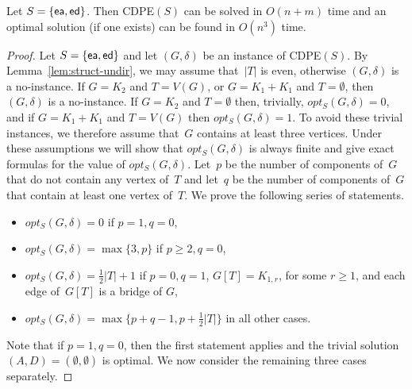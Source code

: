 \documentclass[11pt]{llncs}
\newcommand{\opts}{opt_S}
\newcommand{\ed}{{\sf ed}}
\newcommand{\ea}{{\sf ea}}
\newcommand{\cdpe}{{\sc CDPE}}
\begin{document}
\begin{theorem}\label{thm:edit-undir}
Let $S=\{\ea,\ed\}$. Then \cdpe$(S)$ can be solved in $O(n+m)$ time and an
optimal solution (if one exists) can be found in $O(n^3)$ time.
\end{theorem}

\begin{proof}
Let $S=\{\ea,\ed\}$ and let $(G,\delta)$ be an instance of \cdpe$(S)$.  By
Lemma~\ref{lem:struct-undir}, we may assume that~$|T|$ is even, otherwise
$(G,\delta)$ is a no-instance.  If $G=K_2$ and $T=V(G)$, or $G=K_1+K_1$ and
$T=\emptyset$, then $(G,\delta)$ is a no-instance.  
If $G=K_2$ and $T=\emptyset$ then, trivially, $\opts(G,\delta)=0$, and if
$G=K_1+K_1$ and $T=V(G)$ then $\opts(G,\delta)=1$.
To avoid these trivial
instances, we therefore assume that~$G$ contains at least three vertices.
Under these assumptions we will show that $\opts(G,\delta)$ is always finite and give exact formulas for the value of $\opts(G,\delta)$. 
Let~$p$ be the number of components of~$G$ that do not contain
any vertex of~$T$ and let~$q$ be the number of components of~$G$ that contain
at least one vertex of~$T$.
We  prove the following series of statements.

\begin{itemize}
\item $\opts(G,\delta)=0$ if $p=1,q=0$,
\item $\opts(G,\delta)=\max\{3,p\}$ if $p \geq 2,q=0$,
\item $\opts(G,\delta)=\frac{1}{2}|T|+1$ if $p=0,q=1$,  
$G[T]=K_{1,r}$, for some $r\geq 1$, and each edge of~$G[T]$ is a bridge of $G$,
\item $\opts(G,\delta)=\max\{p+q-1,p+\frac{1}{2}|T|\}$ in all other cases.
\end{itemize}

\smallskip
\noindent
Note that if $p=1,q=0$, then the first statement applies and the trivial
solution $(A,D)=(\emptyset,\emptyset)$ is optimal.
We now consider the remaining three cases separately.


\end{proof}
\end{document}

